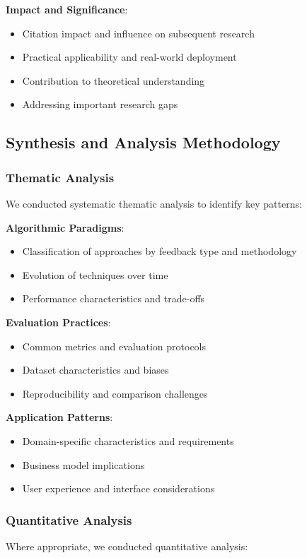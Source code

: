 \textbf{Impact and Significance}:
\begin{itemize}
    \item Citation impact and influence on subsequent research
    \item Practical applicability and real-world deployment
    \item Contribution to theoretical understanding
    \item Addressing important research gaps
\end{itemize}

\subsection{Synthesis and Analysis Methodology}

\subsubsection{Thematic Analysis}
We conducted systematic thematic analysis to identify key patterns:

\textbf{Algorithmic Paradigms}:
\begin{itemize}
    \item Classification of approaches by feedback type and methodology
    \item Evolution of techniques over time
    \item Performance characteristics and trade-offs
\end{itemize}

\textbf{Evaluation Practices}:
\begin{itemize}
    \item Common metrics and evaluation protocols
    \item Dataset characteristics and biases
    \item Reproducibility and comparison challenges
\end{itemize}

\textbf{Application Patterns}:
\begin{itemize}
    \item Domain-specific characteristics and requirements
    \item Business model implications
    \item User experience and interface considerations
\end{itemize}

\subsubsection{Quantitative Analysis}
Where appropriate, we conducted quantitative analysis:

